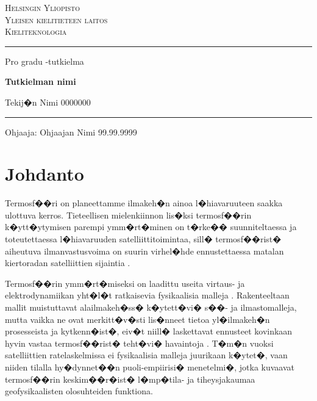 \documentclass[12pt,a4paper,finnish,margin=2in]{article}
\begin{document}
\parskip 2mm
\parindent 0mm

\begin{titlepage}
  \setlength{\parindent}{0mm}
  \sloppy
  \large \textsc{Helsingin Yliopisto \\
                 Yleisen kielitieteen laitos \\
                 Kieliteknologia}
  \vspace{5mm}

  \hrule height3pt
  \vspace{20mm}

  \begin{center}
    \large Pro gradu -tutkielma
    \linebreak \vfill   

    \huge \textbf{Tutkielman nimi}
    \vspace{20mm}

    \Large Tekij�n Nimi \linebreak
    \normalsize 0000000  %
    \vfill

  \end{center}
  \hrule height2pt
  \vspace{15mm}

  Ohjaaja: Ohjaajan Nimi
  \hfill
  99.99.9999     %
\end{titlepage}

\tableofcontents

\pagebreak


\section{Johdanto}

Termosf��ri on planeettamme ilmakeh�n ainoa l�hiavaruuteen saakka ulottuva kerros. Tieteellisen mielenkiinnon lis�ksi termosf��rin k�ytt�ytymisen parempi ymm�rt�minen on t�rke�� suunniteltaessa ja toteutettaessa l�hiavaruuden satelliittitoimintaa, sill� termosf��rist� aiheutuva ilmanvastusvoima on suurin virhel�hde ennustettaessa matalan kiertoradan satelliittien sijaintia \citep{Doornbos_2007}. 

Termosf��rin ymm�rt�miseksi on laadittu useita virtaus- ja elektrodynamiikan yht�l�t ratkaisevia fysikaalisia malleja \citep[esim.][]{richmond_1992, ridley_2006}. Rakenteeltaan mallit muistuttavat alailmakeh�ss� k�ytett�vi� s��- ja ilmastomalleja, mutta vaikka ne ovat merkitt�v�sti lis�nneet tietoa yl�ilmakeh�n prosesseista ja kytkenn�ist�, eiv�t niill� laskettavat ennusteet kovinkaan hyvin vastaa termosf��rist� teht�vi� havaintoja \citep{Shim_2014}. T�m�n vuoksi satelliittien ratelaskelmissa ei fysikaalisia malleja juurikaan k�ytet�, vaan niiden tilalla hy�dynnet��n puoli-empiirisi� menetelmi�, jotka kuvaavat termosf��rin keskim��r�ist� l�mp�tila- ja tiheysjakaumaa geofysikaalisten olosuhteiden funktiona.
\end{document}
